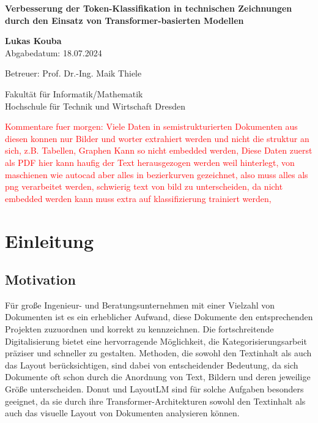 \documentclass[12pt,a4paper,twoside]{article}
\newcommand\myworries[1]{\textcolor{red}{#1}}
\begin{document}
\begin{titlepage}

  \vfill
  {\bfseries\Huge Verbesserung der Token-Klassifikation in technischen Zeichnungen durch den Einsatz
von Transformer-basierten Modellen\par}
  \vfill

  \textbf{Lukas Kouba} \\
  Abgabedatum: 18.07.2024

  \vfill

  Betreuer: Prof. Dr.-Ing. Maik Thiele

  \vfill

  Fakultät für Informatik/Mathematik \\
  Hochschule für Technik und Wirtschaft Dresden
\end{titlepage}

\newpage
\tableofcontents
\newpage

\myworries{Kommentare fuer morgen:
Viele Daten in semistrukturierten Dokumenten aus diesen konnen nur Bilder und worter extrahiert werden und nicht die struktur an sich, z.B. Tabellen, Graphen
Kann so nicht embedded werden,
Diese Daten zuerst als PDF hier kann haufig der Text herausgezogen werden weil hinterlegt, von maschienen wie autocad aber alles in bezierkurven gezeichnet, also muss alles als png verarbeitet werden,
schwierig text von bild zu unterscheiden,
da nicht embedded werden kann muss extra auf klassifizierung trainiert werden,}

\section{Einleitung}
\subsection{Motivation}
Für große Ingenieur- und Beratungsunternehmen mit einer Vielzahl von Dokumenten ist es ein erheblicher Aufwand, diese Dokumente den entsprechenden Projekten zuzuordnen und korrekt zu kennzeichnen. Die fortschreitende Digitalisierung bietet eine hervorragende Möglichkeit, die Kategorisierungsarbeit präziser und schneller zu gestalten. Methoden, die sowohl den Textinhalt als auch das Layout berücksichtigen, sind dabei von entscheidender Bedeutung, da sich Dokumente oft schon durch die Anordnung von Text, Bildern und deren jeweilige Größe unterscheiden. Donut und LayoutLM sind für solche Aufgaben besonders geeignet, da sie durch ihre Transformer-Architekturen sowohl den Textinhalt als auch das visuelle Layout von Dokumenten analysieren können.
\end{document}
